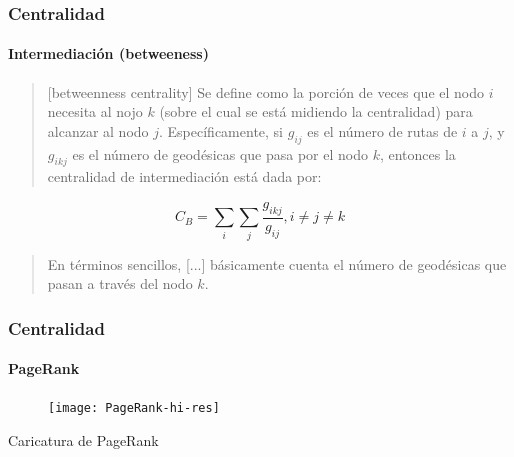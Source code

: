 \documentclass[10pt,draft]{beamer}
\begin{document}
\begin{frame}
\frametitle{Centralidad}
\framesubtitle{Intermediaci\'on (betweeness)}

\begin{quote}
[betweenness centrality] Se define como la porci\'on de veces que el nodo $i$ necesita al nojo $k$ (sobre
el cual se est\'a midiendo la centralidad) para alcanzar al nodo $j$.
Espec\'ificamente, si $g_{ij}$ es el n\'umero de rutas de $i$ a $j$, y $g_{ikj}$
es el n\'umero de geod\'esicas que pasa por el nodo $k$, entonces la centralidad
de intermediaci\'on est\'a dada por: 
\end{quote}

\begin{equation}
C_B=\sum_i\sum_j{\frac{g_{ikj}}{g_{ij}}}, i \neq j \neq k
\end{equation}

\begin{quote}
En t\'erminos sencillos, [...] b\'asicamente cuenta el n\'umero de geod\'esicas
que pasan a trav\'es del nodo $k$. \cite{borgatti2005centrality}
\end{quote}
\end{frame}

\begin{frame}
\frametitle{Centralidad}
\framesubtitle{PageRank}
\begin{figure}
\centering
\texttt{[image: PageRank-hi-res]}
\end{figure}
{\footnotesize Caricatura de PageRank}
\end{frame}
\end{document}
